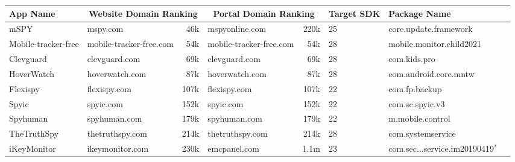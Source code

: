 \documentclass[sigconf,balance=false]{acmart}
\newcommand{\ltgrey}{\rowcolor[gray]{0.88}}
\begin{document}
\begin{table*}[t]
  \begin{tabular}{@{}llrlrll@{\hskip 5pt}l}
    App Name             & \multicolumn{2}{c}{Website Domain \hspace*{0.2in}\hfill\hspace*{0.1in} Ranking}  & \multicolumn{2}{c}{Portal Domain \hspace*{0.25in}\hfill\hspace*{0.1in} Ranking} & Target SDK &Package Name                                    \\
    \midrule
    mSPY                 &mspy.com                 &46k             & mspyonline.com  &220k                          &25               &core.update.framework                           \\
    Mobile-tracker-free  &mobile-tracker-free.com  &54k             &mobile-tracker-free.com  &54k                   &28                      &mobile.monitor.child2021                        \\
    Clevguard            &clevguard.com            &69k             & clevguard.com  &69k                            &28             &com.kids.pro                                    \\
    \ltgrey HoverWatch   &hoverwatch.com           &87k             &hoverwatch.com  &87k                            &28          &com.android.core.mntw                           \\
    \ltgrey Flexispy     &flexispy.com             &107k            &flexispy.com &107k                              &22          &com.fp.backup                                   \\
    \ltgrey Spyic        &spyic.com                &152k            &spyic.com  &152k                                &22         &com.sc.spyic.v3                                 \\
    Spyhuman             &spyhuman.com             &179k            & spyhuman.com  &179k                            &22              &m.mobile.control                                \\
    TheTruthSpy          &thetruthspy.com          &214k            & thetruthspy.com &214k                          &28               &com.systemservice                               \\
    iKeyMonitor          &ikeymonitor.com          &230k            &emcpanel.com  &1.1m                             &23        &com.sec...service.im20190419$^{*}$  \\

\end{tabular}
\end{table*}
\end{document}
